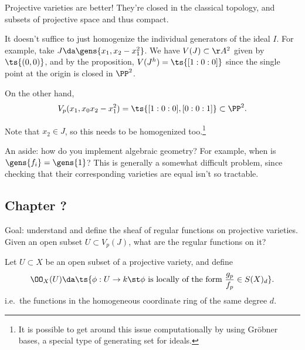 \begin{remark}

Projective varieties are better! They're closed in the classical
topology, and subsets of projective space and thus compact.

\end{remark}

\begin{remark}

It doesn't suffice to just homogenize the individual generators of the
ideal \(I\). For example, take \(J \da \gens{x_1, x_2 - x_1^2}\). We
have \(V(J) \subset \AA^2\) given by \(\ts{(0, 0)}\), and by the
proposition, \(V(J^h) = \ts{[1:0:0]}\) since the single point at the
origin is closed in \(\PP^2\).

On the other hand,
\begin{align*}  
V_p(x_1, x_0 x_2 - x_1^2) = \ts{[1:0:0], [0:0:1]} \subset \PP^2
.\end{align*}

Note that \(x_2 \in J\), so this needs to be homogenized too.\footnote{It
  is possible to get around this issue computationally by using Gröbner
  bases, a special type of generating set for ideals.}

\end{remark}

\begin{remark}

An aside: how do you implement algebraic geometry? For example, when is
\(\gens{f_i} = \gens{1}\)? This is generally a somewhat difficult
problem, since checking that their corresponding varieties are equal
isn't so tractable.

\end{remark}

\hypertarget{chapter}{%
\subsection{Chapter ?}\label{chapter}}

Goal: understand and define the sheaf of regular functions on projective
varieties. Given an open subset \(U\subset V_p(J)\), what are the
regular functions on it?

\begin{definition}[?]

Let \(U\subset X\) be an open subset of a projective variety, and define
\begin{align*}  
\OO_X(U) \da \ts{\phi:U\to k \st \phi \text{ is locally of the form }   {g_p \over f_p} \in S(X)_d }
.\end{align*} i.e.~the functions in the homogeneous coordinate ring of
the same degree \(d\).

\end{definition}

